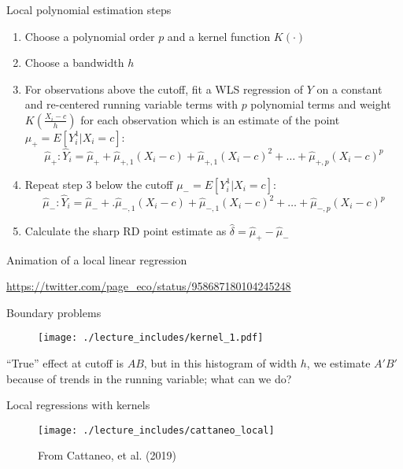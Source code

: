 \documentclass{beamer}
\begin{document}
\begin{frame}{Local polynomial estimation steps}

\begin{enumerate}
\item Choose a polynomial order $p$ and a kernel function $K(\cdot)$
\item Choose a bandwidth $h$
\item For observations above the cutoff, fit a WLS regression of $Y$ on a constant and re-centered running variable terms with $p$ polynomial terms and weight $K(\frac{X_i-c}{h})$ for each observation which is an estimate of the point$\mu_+=E[Y_i^1|X_i=c]$:$$\widehat{\mu}_+:\widehat{Y}_i=\widehat{\mu}_+ + \widehat{\mu}_{+,1}(X_i-c)+\widehat{\mu}_{+,1}(X_i-c)^2 + \dots + \widehat{\mu}_{+,p}(X_i-c)^p$$
\item Repeat step 3 below the cutoff $\mu_-=E[Y_i^1|X_i=c]$:$$\widehat{\mu}_-:\widehat{Y}_i=\widehat{\mu}_- +. \widehat{\mu}_{-,1}(X_i-c)+\widehat{\mu}_{-,1}(X_i-c)^2 + \dots + \widehat{\mu}_{-,p}(X_i-c)^p$$
\item Calculate the sharp RD point estimate as $\widehat{\delta}=\widehat{\mu}_+ - \widehat{\mu}_-$
\end{enumerate}

\end{frame}


\begin{frame}{Animation of a local linear regression}

\url{https://twitter.com/page_eco/status/958687180104245248}

\end{frame}


\begin{frame}{Boundary problems}
	
		\begin{figure}
		\texttt{[image: ./lecture\_includes/kernel\_1.pdf]}
		\end{figure}

``True'' effect at cutoff is $AB$, but in this histogram of width $h$, we estimate $A'B'$ because of trends in the running variable; what can we do?

	
\end{frame}


\begin{frame}{Local regressions with kernels}

		\begin{figure}
		\texttt{[image: ./lecture\_includes/cattaneo\_local]}
		\caption{From Cattaneo, et al. (2019)}
		\end{figure}

\end{frame}
\end{document}
